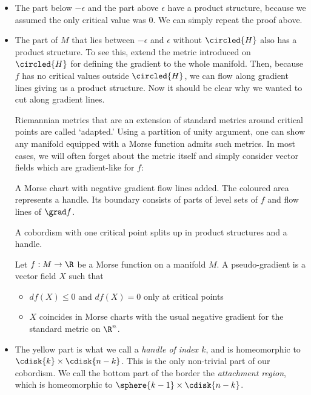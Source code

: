 \begin{itemize}
    \item[\circled{A}] The part below $-\epsilon$ and the part above $\epsilon$ have a product structure, because we assumed the only critical value was $0$.
        We can simply repeat the proof above.
    \item[\circled{B}] The part of $M$ that lies between $-\epsilon$  and $\epsilon$ without $\circled{H}$ also has a product structure.
        To see this, extend the metric introduced on $\circled{H}$ for defining the gradient to the whole manifold. Then, because $f$ has no critical values outside $\circled{H}$, we can flow along gradient lines giving us a product structure.
        Now it should be clear why we wanted to cut along gradient lines.

        Riemannian metrics that are an extension of standard metrics around critical points are called `adapted.'
        Using a partition of unity argument, one can show any manifold equipped with a Morse function admits such metrics.
        In most cases, we will often forget about the metric itself and simply consider vector fields which are gradient-like for $f$:

        \begin{marginfigure}
            \centering
            \caption{A Morse chart with negative gradient flow lines added.
            The coloured area represents a handle. Its boundary consists of parts of level sets of $f$ and flow lines of $\grad f$.}
            \label{fig:morse-chart-flow-lines}
        \end{marginfigure}
        \begin{marginfigure}
            \centering
            \caption{A cobordism with one critical point splits up in product structures and a handle.}
            \label{fig:morse-chart-zoomed-in}
        \end{marginfigure}

        \begin{definition}
            Let $f: M \to  \R$ be a Morse function on a manifold $M$. A pseudo-gradient is a vector field $X$ such that
            \begin{itemize}
                \item $df(X) \le 0$ and $df(X) = 0$ only at critical points
                \item $X$ coincides in Morse charts with the usual negative gradient for the standard metric on $\R^{n}$.
            \end{itemize}
        \end{definition}
    \item[\circled{H}]  The yellow part is what we call a \emph{handle of index $k$}, and is homeomorphic to $\cdisk{k} \times \cdisk{n-k}$.
        This is the only non-trivial part of our cobordism.
        We call the bottom part of the border the \emph{attachment region}, which is homeomorphic to $\sphere{k-1} \times \cdisk{n-k}$.


\end{itemize}
